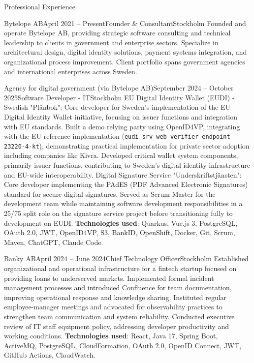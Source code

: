 \documentclass{resume}
\begin{document}
\begin{rSection}{Professional Experience}

\begin{rSubsection}{Bytelope AB}{April 2021 -- Present}{Founder \& Consultant}{Stockholm}
\bItem Founded and operate Bytelope AB, providing strategic software consulting and technical leadership to clients in government and enterprise sectors.
\bItem Specialize in architectural design, digital identity solutions, payment systems integration, and organizational process improvement.
\bItem Client portfolio spans government agencies and international enterprises across Sweden.
\end{rSubsection}

\begin{rClientSubsection}{Agency for digital government (via Bytelope AB)}{September 2024 -- October 2025}{Software Developer - IT}{Stockholm} %
\bItem EU Digital Identity Wallet (EUDI) - Swedish "Plånbok": Core developer for Sweden's implementation of the EU Digital Identity Wallet initiative, focusing on issuer functions and integration with EU standards.
\bItem Built a demo relying party using OpenID4VP, integrating with the EU reference implementation (\texttt{eudi-srv-web-verifier-endpoint-23220-4-kt}), demonstrating practical implementation for private sector adoption including companies like Kivra.
\bItem Developed critical wallet system components, primarily issuer functions, contributing to Sweden's digital identity infrastructure and EU-wide interoperability.
\bItem Digital Signature Service "Underskriftstjänsten": Core developer implementing the PAdES (PDF Advanced Electronic Signatures) standard for secure digital signatures.
\bItem Served as Scrum Master for the development team while maintaining software development responsibilities in a 25/75 split role on the signature service project before transitioning fully to development on EUDI.
\bItem \textbf{Technologies used}: Quarkus, Vue.js 3, PostgreSQL, OAuth 2.0, JWT, OpenID4VP, S3, BankID, OpenShift, Docker, Git, Scrum, Maven, ChatGPT, Claude Code.
\end{rClientSubsection}

\begin{rSubsection}{Banky AB}{April 2024 -- June 2024}{Chief Technology Officer}{Stockholm}
\bItem Established organizational and operational infrastructure for a fintech startup focused on providing loans to underserved markets.
\bItem Implemented formal incident management processes and introduced Confluence for team documentation, improving operational response and knowledge sharing.
\bItem Instituted regular employee-manager meetings and advocated for observability practices to strengthen team communication and system reliability.
\bItem Conducted executive review of IT staff equipment policy, addressing developer productivity and working conditions.
\bItem \textbf{Technologies used}: React, Java 17, Spring Boot, ActiveMQ, PostgreSQL, CloudFormation, OAuth 2.0, OpenID Connect, JWT, GitHub Actions, CloudWatch.
\end{rSubsection}


\end{rSection}
\end{document}
